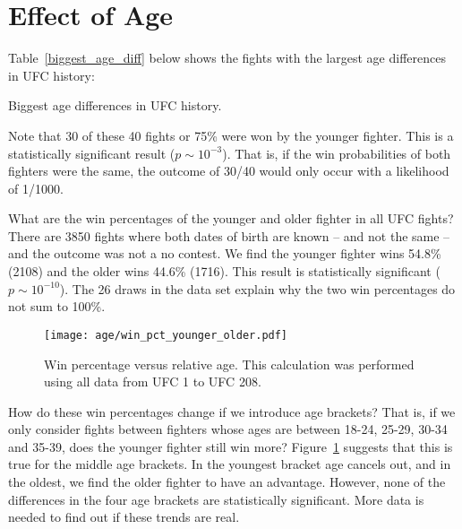 \clearpage
\section{Effect of Age}
Table~\ref{biggest_age_diff} below shows the fights
with the largest age differences in UFC history:

\begin{center}
\begin{table}[h!]

\caption{Biggest age differences in UFC history.}
\label{biggest_age_diff}
\end{table}
\end{center}

\clearpage

Note that 30 of these 40 fights or 75\% were won by the younger
fighter. This is a statistically
significant result ($p\sim 10^{-3}$). That is, if the win
probabilities of both fighters were the same, the outcome
of 30/40 would only occur with a likelihood of 1/1000.

What are the win percentages
of the younger and older fighter in all UFC fights?
There
are 3850 fights where both dates of birth are known
-- and not the same -- 
and the outcome was not a no contest.
We find
the younger fighter wins 54.8\% (2108) and the older
wins 44.6\% (1716). This result
is statistically significant ($p\sim 10^{-10}$).
The 26 draws in the data set explain why the two
win percentages do not sum to 100\%.

\begin{figure}[h]
\begin{center}
\texttt{[image: age/win\_pct\_younger\_older.pdf]}
\caption{Win percentage versus relative age. This calculation
was performed using all data from UFC 1 to UFC 208.}
\label{win_pct_younger_older}
\end{center}
\end{figure}

How do these win percentages change if we introduce
age brackets? That is, if we only consider fights
between fighters whose ages are between 18-24, 25-29,
30-34 and 35-39, does the younger fighter still win more?
Figure~\ref{win_pct_younger_older} suggests
that this is true for the middle age brackets. In the youngest
bracket age cancels out, and in the oldest, we find the
older fighter to have an advantage. However, none
of the differences in the four age brackets are statistically
significant. More data is needed to find out if these trends
are real.

